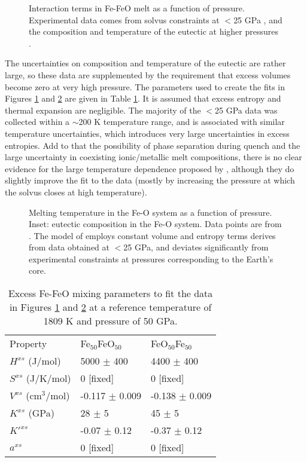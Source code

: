 \begin{figure}[ht!]
  \centering
  \caption{Interaction terms in Fe-FeO melt as a function of pressure. Experimental data comes from solvus constraints at $<$25 GPa \citep{TOT2007,Frostetal2010}, and the composition and temperature of the eutectic at higher pressures \citep{SHCPW2008}.}
  \label{fig:Fe_O_interaction}
\end{figure}

The uncertainties on composition and temperature of the eutectic are rather large, so these data are supplemented by the requirement that excess volumes become zero at very high pressure. The parameters used to create the fits in Figures \ref{fig:Fe_O_interaction} and \ref{fig:Fe_O_melting} are given in Table \ref{tab:Fe_FeO}. It is assumed that excess entropy and thermal expansion are negligible. The majority of the $<$25 GPa data was collected within a $\sim$200 K temperature range, and is associated with similar temperature uncertainties, which introduces very large uncertainties in excess entropies. Add to that the possibility of phase separation during quench and the large uncertainty in coexisting ionic/metallic melt compositions, there is no clear evidence for the large temperature dependence proposed by \cite{Frostetal2010}, although they do slightly improve the fit to the data (mostly by increasing the pressure at which the solvus closes at high temperature).

\begin{figure}[ht!]
  \centering
  \caption{Melting temperature in the Fe-O system as a function of pressure. Inset: eutectic composition in the Fe-O system. Data points are from \cite{SHCPW2008}. The model of \cite{Frostetal2010} employs constant volume and entropy terms derives from data obtained at $<$25 GPa, and deviates significantly from experimental constraints at pressures corresponding to the Earth's core.}
  \label{fig:Fe_O_melting}
\end{figure}

\begin{table}[ht!]
\centering
\caption{Excess Fe-FeO mixing parameters to fit the data in Figures \ref{fig:Fe_O_interaction} and \ref{fig:Fe_O_melting} at a reference temperature of 1809 K and pressure of 50 GPa.}
\label{tab:Fe_FeO}
\begin{tabular}{lll}
  Property        & Fe$_{50}$FeO$_{50}$  & FeO$_{50}$Fe$_{50}$ \\
  $H^{xs}$ (J/mol) &  5000 $\pm$ 400 & 4400 $\pm$ 400  \\
  $S^{xs}$ (J/K/mol)  & 0 [fixed] & 0 [fixed] \\
  $V^{xs}$ (cm$^3$/mol)   & -0.117 $\pm$ 0.009 &  -0.138 $\pm$ 0.009 \\
  $K^{xs}$  (GPa)  & 28 $\pm$ 5 & 45 $\pm$ 5  \\
  $K'^{xs}$   & -0.07 $\pm$ 0.12 & -0.37 $\pm$ 0.12  \\
  $a^{xs}$   & 0 [fixed] & 0 [fixed]  
\end{tabular}
\end{table}


